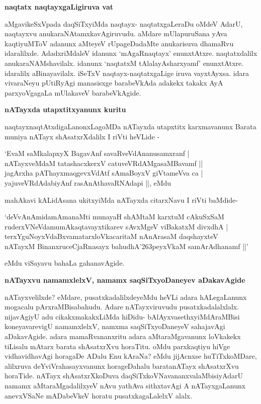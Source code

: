 \noindent
{\bf\large{naqtatx naqtayxgaLigiruva vat}}

aMgavikeSxVpada daqSiTxyiMda naqtayx- naqtatxgaLeraDu oMdeV AdarU, naqtayxvu anukaraNAtamxkavAgiruvudu. aMdare mUlapuruSana yAva kaqtiyuMToV adanunx aMteyeV rUpageDadaMte anukarisuva dhamaRvu idaralilxde. AdadxriMdaleV idanunx `mAgaRnaqtayx' enunxtAtxre. naqtatxdalilx anukaraNAMshavilalx. idanunx `naqtatxM tAlalayAsharxyamf' enunxtAtxre. idaralilx aBinayavilalx. iSeTxV naqtayx-naqtatxgaLige iruva vayxtAyxsa. idara vivaraNeyu pUtiRyAgi manasisxge barabeVkAda adakekx takakx AyA parxyoVgagaLa mUlakaveV barabeVkAgide.

\noindent
{\bf\large{nATayxda utapxtitxyanunx kuritu}}\label{page242}

naqtayxnaqtAtxdigaLanonxLagoMDa nATayxda utapxtitx karxmavanunx Barata muniya nATayx shAsatxrXdalilx I riVti heVLide -

\begin{shloka}
`EvaM saMkalapxyX BagavAnf savaRveVdAnanusamxranf |\\\label{242}
nATayxveMdaM tatashacxkerxV catuveVRdAMgasaMBavamf ||\\
jagArxha pAThayxmaqgevxVdAtf sAmaBoyxV giVtameVva ca |\\
yajuveVRdAdabiyAnf rasAnAthavaRNAdapi ||, eMdu
\end{shloka}

mahAkavi kALidAsana ukitxyiMda nATayxda citarxNavu I riVti baMdide-

\begin{shloka}
`deVvAnAmidamAmanaMti munayaH shAMtaM karxtuM cAkuSxSaM\\\label{242}
ruderxVNeVdamumAkaqtavayxtikarev sAvxMgeV viBakatxM divxdhA |\\
terxYguNoyxVdaBxvamatarxloVkacaritaM nAnArasaM daqshayxteV\\
nATayxM BinanxruceCjaRnasayx bahudhA\char'263peyxVkaM samArAdhanamf ||'
\end{shloka}

eMdu viSayavu bahaLa gahanavAgide.

\noindent
{\bf\large{nATayxvu namamxlelxV, namamx saqSiTxyoDaneyev aDakavAgide}}\label{page242}

nATayxvelilxde? eMdare, pusatxkadalilxdeyeMdu heVLi adara hALegaLanunx mogacalu pArxraMBisabahudu. Adare nATayxviruvudu pusatxkadalalxlalx. nijavAgiyU adu cikakxmakakxLiMda hiDidu- bAlAyxvasethxyiMdAraMBisi koneyavarevigU namamxlelxV, namxma saqSiTxyoDaneyeV sahajavAgi aDakavAgide. adara mamaRvananxritu adara aMtaraMgavanunx loVkakekx tiLisalu mAtarx barata shAsatxrXvu horaTitu. oMdu parxkaqtiyu hiVge vidhavidhavAgi horagaDe ADalu Enu kAraNa? eMdu jijAcnxse huTiTxkoMDare, alilxruva deYviVrahasayxvanunx horageDahalu baratanATayx shAsatxrXvu horaTide. nATayx shAsatxrXkoDuva daqSiTxkoVNavananxvalaMbisiyAdarU namamx aMtaraMgadalilxyeV nAvu yathAva sithxtavAgi A nATayxgaLanunx anevxVSaNe mADabeVkeV horatu pusatxkagaLalelxV alalx.

